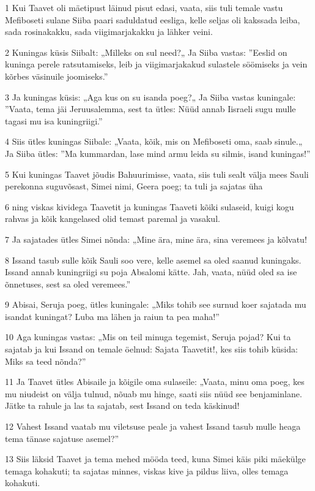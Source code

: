 \par 1 Kui Taavet oli mäetipust läinud pisut edasi, vaata, siis tuli temale vastu Mefiboseti sulane Siiba paari saduldatud eesliga, kelle seljas oli kakssada leiba, sada rosinakakku, sada viigimarjakakku ja lähker veini.
\par 2 Kuningas küsis Siibalt: „Milleks on sul need?„ Ja Siiba vastas: ”Eeslid on kuninga perele ratsutamiseks, leib ja viigimarjakakud sulastele söömiseks ja vein kõrbes väsinuile joomiseks.”
\par 3 Ja kuningas küsis: „Aga kus on su isanda poeg?„ Ja Siiba vastas kuningale: ”Vaata, tema jäi Jeruusalemma, sest ta ütles: Nüüd annab Iisraeli sugu mulle tagasi mu isa kuningriigi.”
\par 4 Siis ütles kuningas Siibale: „Vaata, kõik, mis on Mefiboseti oma, saab sinule.„ Ja Siiba ütles: ”Ma kummardan, lase mind armu leida su silmis, isand kuningas!”
\par 5 Kui kuningas Taavet jõudis Bahuurimisse, vaata, siis tuli sealt välja mees Sauli perekonna suguvõsast, Simei nimi, Geera poeg; ta tuli ja sajatas üha
\par 6 ning viskas kividega Taavetit ja kuningas Taaveti kõiki sulaseid, kuigi kogu rahvas ja kõik kangelased olid temast paremal ja vasakul.
\par 7 Ja sajatades ütles Simei nõnda: „Mine ära, mine ära, sina veremees ja kõlvatu!
\par 8 Issand tasub sulle kõik Sauli soo vere, kelle asemel sa oled saanud kuningaks. Issand annab kuningriigi su poja Absalomi kätte. Jah, vaata, nüüd oled sa ise õnnetuses, sest sa oled veremees.”
\par 9 Abisai, Seruja poeg, ütles kuningale: „Miks tohib see surnud koer sajatada mu isandat kuningat? Luba ma lähen ja raiun ta pea maha!”
\par 10 Aga kuningas vastas: „Mis on teil minuga tegemist, Seruja pojad? Kui ta sajatab ja kui Issand on temale öelnud: Sajata Taavetit!, kes siis tohib küsida: Miks sa teed nõnda?”
\par 11 Ja Taavet ütles Abisaile ja kõigile oma sulaseile: „Vaata, minu oma poeg, kes mu niudeist on välja tulnud, nõuab mu hinge, saati siis nüüd see benjaminlane. Jätke ta rahule ja las ta sajatab, sest Issand on teda käskinud!
\par 12 Vahest Issand vaatab mu viletsuse peale ja vahest Issand tasub mulle heaga tema tänase sajatuse asemel?”
\par 13 Siis läksid Taavet ja tema mehed mööda teed, kuna Simei käis piki mäekülge temaga kohakuti; ta sajatas minnes, viskas kive ja pildus liiva, olles temaga kohakuti.
